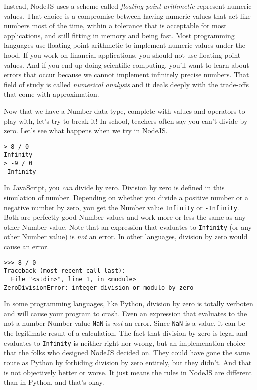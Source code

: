 Instead, NodeJS uses a scheme called \textit{floating point arithmetic} represent numeric values.  That choice is a compromise between having numeric values that act like numbers most of the time, within a tolerance that is acceptable for most applications, and still fitting in memory and being fast. Most programming languages use floating point arithmetic to implement numeric values under the hood. If you work on financial applications, you should not use floating point values. And if you end up doing scientific computing, you'll want to learn about errors that occur because we cannot implement infinitely precise numbers. That field of study is called \emph{numerical analysis} and it deals deeply with the trade-offs that come with approximation.

Now that we have a \textsf{Number} data type, complete with values and operators to play with, let's try to break it! In school, teachers often say you can't divide by zero. Let's see what happens when we try in NodeJS.

\begin{lstlisting}
> 8 / 0
Infinity
> -9 / 0
-Infinity
\end{lstlisting}

In JavaScript, you \emph{can} divide by zero. Division by zero is defined in this simulation of number. Depending on whether you divide a positive number or a negative number by zero, you get the \textsf{Number} value \texttt{Infinity} or \texttt{-Infinity}. Both are perfectly good \textsf{Number} values and work more-or-less the same as any other \textsf{Number} value. Note that an expression that evaluates to \texttt{Infinity} (or any other \textsf{Number} value) is \emph{not} an error. In other languages, division by zero would cause an error.

\begin{lstlisting}[caption={Try this at home, kids! A stack trace caused by a \texttt{ZeroDivisionError} in a Python interpreter.}]
>>> 8 / 0
Traceback (most recent call last):
  File "<stdin>", line 1, in <module>
ZeroDivisionError: integer division or modulo by zero
\end{lstlisting}

In some programming languages, like Python, division by zero is totally verboten and will cause your program to crash. Even an expression that evaluates to the not-a-number \textsf{Number} value \texttt{NaN} is \emph{not} an error. Since \texttt{NaN} is a value, it can be the legitimate result of a calculation. The fact that division by zero is legal and evaluates to \texttt{Infinity} is neither right nor wrong, but an implemenation choice that the folks who designed NodeJS decided on. They could have gone the same route as Python by forbiding division by zero entirely, but they didn't. And that is not objectively better or worse. It just means the rules in NodeJS are different than in Python, and that's okay.

